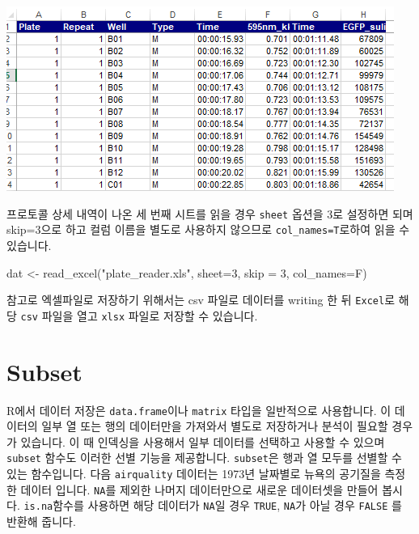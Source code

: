 \documentclass[
]{book}
\newenvironment{Shaded}{\begin{snugshade}}{\end{snugshade}}
\newcommand{\AttributeTok}[1]{\textcolor[rgb]{0.77,0.63,0.00}{#1}}
\newcommand{\DecValTok}[1]{\textcolor[rgb]{0.00,0.00,0.81}{#1}}
\newcommand{\FunctionTok}[1]{\textcolor[rgb]{0.00,0.00,0.00}{#1}}
\newcommand{\NormalTok}[1]{#1}
\newcommand{\OtherTok}[1]{\textcolor[rgb]{0.56,0.35,0.01}{#1}}
\newcommand{\StringTok}[1]{\textcolor[rgb]{0.31,0.60,0.02}{#1}}
\begin{document}
\includegraphics{images/04/excelfile01.PNG}

프로토콜 상세 내역이 나온 세 번째 시트를 읽을 경우 \texttt{sheet} 옵션을 3로 설정하면 되며 skip=3으로 하고 컬럼 이름을 별도로 사용하지 않으므로 \texttt{col\_names=T}로하여 읽을 수 있습니다.

\begin{Shaded}
\begin{Highlighting}[]

\NormalTok{dat }\OtherTok{\textless{}{-}} \FunctionTok{read\_excel}\NormalTok{(}\StringTok{"plate\_reader.xls"}\NormalTok{, }\AttributeTok{sheet=}\DecValTok{3}\NormalTok{, }\AttributeTok{skip =} \DecValTok{3}\NormalTok{, }\AttributeTok{col\_names=}\NormalTok{F)}
\end{Highlighting}
\end{Shaded}

참고로 엑셀파일로 저장하기 위해서는 csv 파일로 데이터를 writing 한 뒤 \texttt{Excel}로 해당 \texttt{csv} 파일을 열고 \texttt{xlsx} 파일로 저장할 수 있습니다.

\hypertarget{subset}{%
\section{Subset}\label{subset}}

R에서 데이터 저장은 \texttt{data.frame}이나 \texttt{matrix} 타입을 일반적으로 사용합니다. 이 데이터의 일부 열 또는 행의 데이터만을 가져와서 별도로 저장하거나 분석이 필요할 경우가 있습니다. 이 때 인덱싱을 사용해서 일부 데이터를 선택하고 사용할 수 있으며 \texttt{subset} 함수도 이러한 선별 기능을 제공합니다. \texttt{subset}은 행과 열 모두를 선별할 수 있는 함수입니다. 다음 \texttt{airquality} 데이터는 1973년 날짜별로 뉴욕의 공기질을 측정한 데이터 입니다. \texttt{NA}를 제외한 나머지 데이터만으로 새로운 데이터셋을 만들어 봅시다. \texttt{is.na}함수를 사용하면 해당 데이터가 \texttt{NA}일 경우 \texttt{TRUE}, \texttt{NA}가 아닐 경우 \texttt{FALSE} 를 반환해 줍니다.
\end{document}
